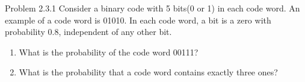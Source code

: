 \begin{problem}{Problem 2.3.1}
    Consider a binary code with 5 bits(0 or 1) in each code word. An example of a code word is 01010. In each code word, a bit is a zero with probability 0.8, independent of any other bit.
    \begin{enumerate}
        \item What is the probability of the code word 00111?
        \item What is the probability that a code word contains exactly three ones?
    \end{enumerate}
\end{problem}